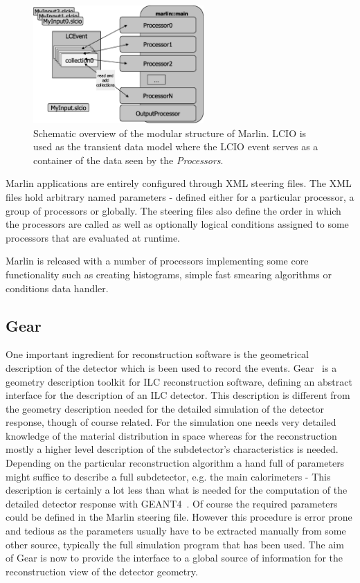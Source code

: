 \begin{figure}[htb]
\centering
\includegraphics*[width=65mm,angle=0]{marlin.eps}
\caption{
Schematic overview of the modular structure of Marlin. LCIO is used as the 
transient data model where the LCIO event serves as a
container of the data seen by the {\em Processors}.
}
\label{fig_marlin}
\end{figure}

 Marlin applications are entirely configured through XML steering files.
The XML files hold arbitrary named parameters - defined
either for a particular processor, a group of processors or globally. The
steering files also define the order in which the
processors are called as well as optionally logical conditions assigned to
some processors that are evaluated at runtime. 

Marlin is released with a number of processors implementing some core
functionality such as creating histograms,
simple fast smearing algorithms or conditions data handler.

\subsection{Gear}

One important ingredient for reconstruction software is the geometrical
description of the detector which is been used to record the events. 
Gear~\cite{ref_gear} is a geometry description toolkit for ILC reconstruction software, 
defining an abstract interface for the description of an ILC detector.
This description is different from the geometry description needed for the 
detailed simulation of the detector response, though of course related. For the
simulation one needs very detailed knowledge of the material
distribution in space whereas for the reconstruction mostly a higher
level description of the subdetector's characteristics is needed.
Depending on the particular reconstruction algorithm a hand full of
parameters might suffice to describe a full subdetector, e.g. the main
calorimeters - 
This description is certainly a lot less than what is needed for the
computation of the detailed detector response with GEANT4~\cite{ref_geant4}. 
Of course the required parameters could be defined in the Marlin steering 
file. However this procedure is error prone and tedious as the parameters 
usually have to be extracted manually 
from some other source, typically the full simulation
program that has been used. 
The aim of Gear is now to provide the interface to a 
global source of information for the reconstruction view of the
detector geometry.

